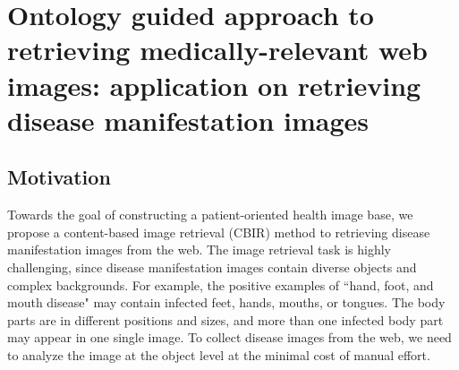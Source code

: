 \chapter{Ontology guided approach to retrieving medically-relevant web images: application on retrieving disease manifestation images}\label{image2}

\section{Motivation}
Towards the goal of constructing a patient-oriented health image base,
we propose a content-based image retrieval (CBIR) method
to retrieving disease manifestation images from the web.
The image retrieval task is highly challenging, since disease manifestation
images contain diverse objects and complex backgrounds.
For example, the positive examples of ``hand,
foot, and mouth disease" may contain infected feet,
hands, mouths, or tongues. The body parts are in
different positions and sizes, and more
than one infected body part may appear in one
single image. To collect disease images from the
web, we need to analyze the image at the object
level at the minimal cost of manual effort.

